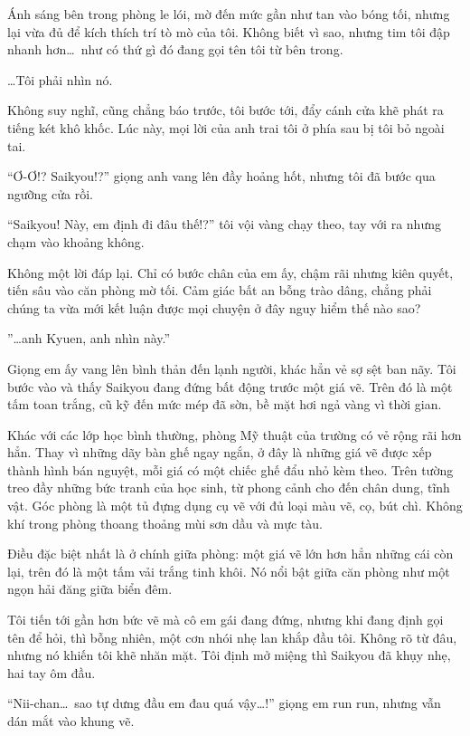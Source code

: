 \documentclass[../main.tex]{subfiles}
\begin{document}
Ánh sáng bên trong phòng le lói, mờ đến mức gần như tan vào bóng tối, nhưng lại vừa đủ để kích thích trí tò mò của tôi. Không biết vì sao, nhưng tim tôi đập nhanh hơn\dots\ như có thứ gì đó đang gọi tên tôi từ bên trong.

\dots Tôi phải nhìn nó.

Không suy nghĩ, cũng chẳng báo trước, tôi bước tới, đẩy cánh cửa khẽ phát ra tiếng két khô khốc. Lúc này, mọi lời của anh trai tôi ở phía sau bị tôi bỏ ngoài tai.

``Ơ-Ơ!? Saikyou!?'' giọng anh vang lên đầy hoảng hốt, nhưng tôi đã bước qua ngưỡng cửa rồi.


``Saikyou! Này, em định đi đâu thế!?'' tôi vội vàng chạy theo, tay với ra nhưng chạm vào khoảng không.

Không một lời đáp lại. Chỉ có bước chân của em ấy, chậm rãi nhưng kiên quyết, tiến sâu vào căn phòng mờ tối. Cảm giác bất an bỗng trào dâng, chẳng phải chúng ta vừa mới kết luận được mọi chuyện ở đây nguy hiểm thế nào sao?

''\dots anh Kyuen, anh nhìn này.''

Giọng em ấy vang lên bình thản đến lạnh người, khác hẳn vẻ sợ sệt ban nãy. Tôi bước vào và thấy Saikyou đang đứng bất động trước một giá vẽ. Trên đó là một tấm toan trắng, cũ kỹ đến mức mép đã sờn, bề mặt hơi ngả vàng vì thời gian.

Khác với các lớp học bình thường, phòng Mỹ thuật của trường có vẻ rộng rãi hơn hẳn. Thay vì những dãy bàn ghế ngay ngắn, ở đây là những giá vẽ được xếp thành hình bán nguyệt, mỗi giá có một chiếc ghế đẩu nhỏ kèm theo. Trên tường treo đầy những bức tranh của học sinh, từ phong cảnh cho đến chân dung, tĩnh vật. Góc phòng là một tủ đựng dụng cụ vẽ với đủ loại màu vẽ, cọ, bút chì. Không khí trong phòng thoang thoảng mùi sơn dầu và mực tàu.

Điều đặc biệt nhất là ở chính giữa phòng: một giá vẽ lớn hơn hẳn những cái còn lại, trên đó là một tấm vải trắng tinh khôi. Nó nổi bật giữa căn phòng như một ngọn hải đăng giữa biển đêm.

Tôi tiến tới gần hơn bức vẽ mà cô em gái đang đứng, nhưng khi đang định gọi tên để hỏi, thì bỗng nhiên, một cơn nhói nhẹ lan khắp đầu tôi. Không rõ từ đâu, nhưng nó khiến tôi khẽ nhăn mặt. Tôi định mở miệng thì Saikyou đã khụy nhẹ, hai tay ôm đầu.

``Nii-chan\dots\ sao tự dưng đầu em đau quá vậy\dots!'' giọng em run run, nhưng vẫn dán mắt vào khung vẽ.
\end{document}
